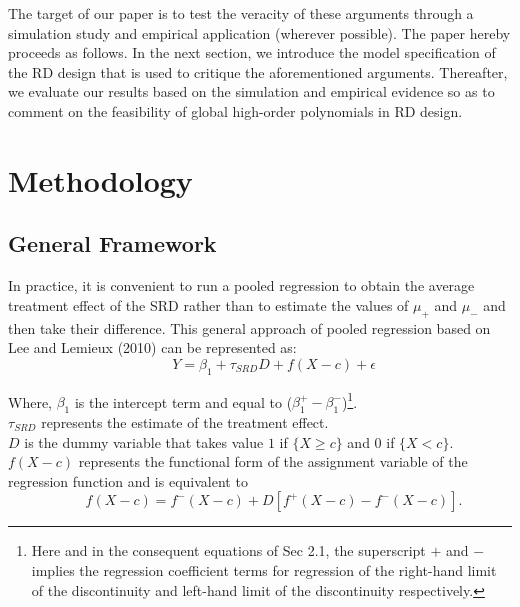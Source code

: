 \documentclass[fleqn]{article}
\begin{document}
    The target of our paper is to test the veracity of these arguments through a simulation study and empirical application (wherever possible). The paper hereby proceeds as follows. In the next section, we introduce the model specification of the RD design that is used to critique the aforementioned arguments. Thereafter, we evaluate our results based on the simulation and empirical evidence so as to comment on the feasibility of global high-order polynomials in RD design.\\

    \section{Methodology}
    \label{sec:methodology}
    
    \subsection{General Framework}
    \label{subsuc:general framework}
    
    In practice, it is convenient to run a pooled regression to obtain the average treatment effect of the SRD rather than to estimate the values of $\mu_{+}$ and $\mu_{-}$ and then take their difference. This general approach of pooled regression based on Lee and Lemieux (2010)\cite{lee2010regression} can be represented as:\\
    \begin{equation*}
        \qquad Y = \beta_{1} + \tau_{SRD} D + f(X-c) + \epsilon
    \end{equation*}

    Where, $\beta_{1}$ is the intercept term and equal to ($\beta_{1}^{+} - \beta_{1}^{-}$)\footnote{Here and in the consequent equations of Sec 2.1, the superscript $+$ and $-$ implies the regression coefficient terms for regression of the right-hand limit of the discontinuity and left-hand limit of the discontinuity respectively.}.\\
    
    $\tau_{SRD}$ represents the estimate of the treatment effect.\\
    
    $D$ is the dummy variable that takes value $1$ if $\{X \geq c \}$ and $0$ if $\{X < c \}$.\\
    
    $f(X-c)$ represents the functional form of the assignment variable of the regression function and is equivalent to\\ 
    \begin{equation*}
        \qquad f(X-c) = f^{-}(X-c) + D \left[f^{+}(X-c) - f^{-}(X-c) \right].
    \end{equation*}
\end{document}
